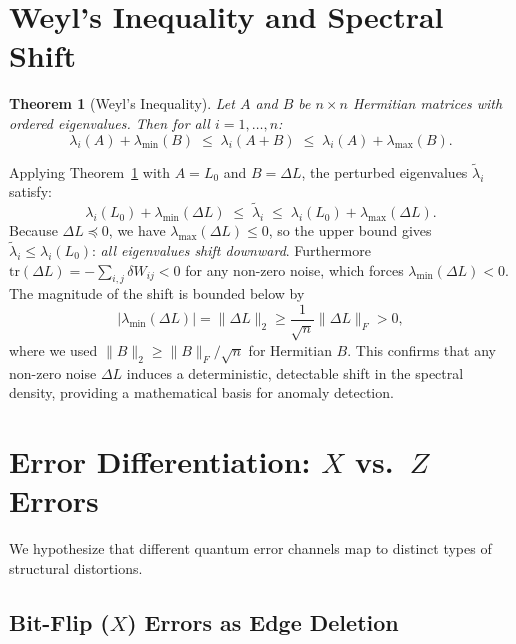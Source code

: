 \documentclass[11pt,a4paper]{article}
\newtheorem{theorem}{Theorem}[section]
\theoremstyle{definition}
\theoremstyle{remark}
\begin{document}
\section{Weyl's Inequality and Spectral Shift}

\begin{theorem}[Weyl's Inequality]\label{thm:weyl}
Let $A$ and $B$ be $n\times n$ Hermitian matrices with ordered eigenvalues.  Then for all
$i=1,\dots,n$:
\[
  \lambda_i(A)+\lambda_{\min}(B)
    \;\le\; \lambda_i(A+B)
    \;\le\; \lambda_i(A)+\lambda_{\max}(B).
\]
\end{theorem}

Applying Theorem~\ref{thm:weyl} with $A=L_0$ and $B=\Delta L$, the perturbed eigenvalues
$\tilde\lambda_i$ satisfy:
\begin{equation}\label{eq:weyl}
  \lambda_i(L_0)+\lambda_{\min}(\Delta L)
    \;\le\;\tilde\lambda_i
    \;\le\;\lambda_i(L_0)+\lambda_{\max}(\Delta L).
\end{equation}
Because $\Delta L\preceq 0$, we have $\lambda_{\max}(\Delta L)\le 0$, so the upper bound gives
$\tilde\lambda_i\le\lambda_i(L_0)$: \emph{all eigenvalues shift downward}.
Furthermore $\mathrm{tr}(\Delta L)=-\sum_{i,j}\delta W_{ij}<0$ for any non-zero noise,
which forces $\lambda_{\min}(\Delta L)<0$.
The magnitude of the shift is bounded below by
\[
  |\lambda_{\min}(\Delta L)| = \|\Delta L\|_2
    \ge \frac{1}{\sqrt{n}}\|\Delta L\|_F > 0,
\]
where we used $\|B\|_2\ge\|B\|_F/\sqrt{n}$ for Hermitian $B$.
This confirms that any non-zero noise $\Delta L$ induces a deterministic, detectable shift in
the spectral density, providing a mathematical basis for anomaly detection.

\section{Error Differentiation: $X$ vs.\ $Z$ Errors}

We hypothesize that different quantum error channels map to distinct types of structural
distortions.

\subsection{Bit-Flip ($X$) Errors as Edge Deletion}
\end{document}
